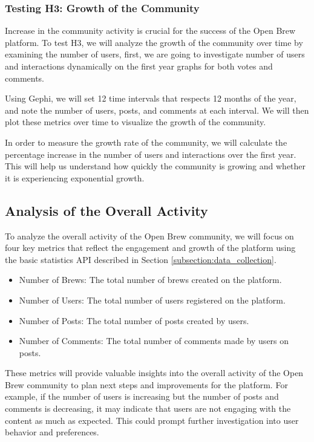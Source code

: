 \documentclass[12pt]{article}
\begin{document}
\subsubsection{Testing H3: Growth of the Community}
\label{subsubsection:testing_h3_growth_of_the_community}
Increase in the community activity is crucial for the success of the Open Brew platform. To test H3, we will analyze the growth of the community over time by examining the number of users, first, we are going to investigate number of users and interactions dynamically on the first year graphs for both votes and comments.

Using Gephi, we will set 12 time intervals that respects 12 months of the year, and note the number of users, posts, and comments at each interval. We will then plot these metrics over time to visualize the growth of the community.

In order to measure the growth rate of the community, we will calculate the percentage increase in the number of users and interactions over the first year. This will help us understand how quickly the community is growing and whether it is experiencing exponential growth.

\subsection{Analysis of the Overall Activity}
\label{subsection:analysis_of_the_overall_activity}
To analyze the overall activity of the Open Brew community, we will focus on four key metrics that reflect the engagement and growth of the platform using the basic statistics API described in Section \ref{subsection:data_collection}.

\begin{itemize}
    \item Number of Brews: The total number of brews created on the platform.
    \item Number of Users: The total number of users registered on the platform.
    \item Number of Posts: The total number of posts created by users.
    \item Number of Comments: The total number of comments made by users on posts.
\end{itemize}

These metrics will provide valuable insights into the overall activity of the Open Brew community to plan next steps and improvements for the platform. For example, if the number of users is increasing but the number of posts and comments is decreasing, it may indicate that users are not engaging with the content as much as expected. This could prompt further investigation into user behavior and preferences.
\end{document}
